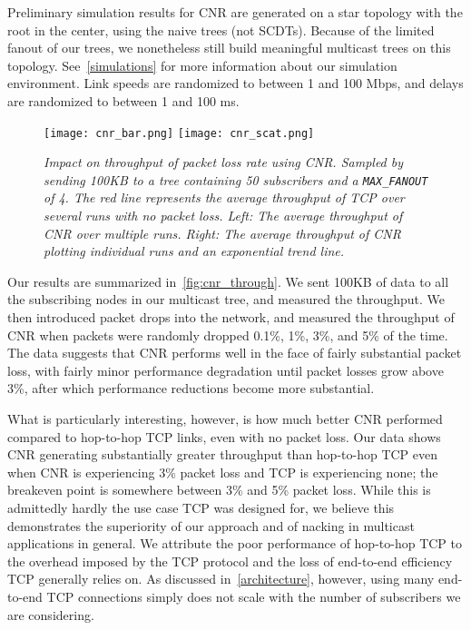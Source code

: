 Preliminary simulation results for CNR are generated on a star topology with the root in the center, using the naive trees (not SCDTs). Because of the limited fanout  of our trees, we nonetheless still build meaningful multicast trees on this topology.  See~\autoref{simulations} for more information about our simulation environment.  Link speeds are randomized to between 1 and 100 Mbps, and delays are randomized to between 1 and 100 ms.

\begin{figure}[h]
	\begin{center}
		\texttt{[image: cnr\_bar.png]}
		\texttt{[image: cnr\_scat.png]}
	\end{center}
	\vspace{-1.3em}
	\caption{\small \itshape Impact on throughput of packet loss rate using CNR. Sampled by sending 100KB to a tree containing 50 subscribers and a \texttt{MAX\_FANOUT} of 4. The red line represents the average throughput of TCP over several runs with no packet loss.  Left: The average throughput of CNR over multiple runs. Right: The average throughput of CNR plotting individual runs and an exponential trend line.}
	\vspace{-1em}
	\label{fig:cnr_through}
\end{figure}

Our results are summarized in~\autoref{fig:cnr_through}. We sent 100KB of data to all the subscribing nodes in our multicast tree, and measured the throughput. We then introduced packet drops into the network, and measured the throughput of CNR when packets were randomly dropped 0.1\%, 1\%, 3\%, and 5\% of the time. The data suggests that CNR performs well in the face of fairly substantial packet loss, with fairly minor performance degradation until packet losses grow above 3\%, after which performance reductions become more substantial. 

What is particularly interesting, however, is how much better CNR performed compared to hop-to-hop TCP links, even with no packet loss. Our data shows CNR generating substantially greater throughput than hop-to-hop TCP even when CNR is experiencing 3\% packet loss and TCP is experiencing none; the breakeven point is somewhere between 3\% and 5\% packet loss. While this is admittedly hardly the use case TCP was designed for, we believe this demonstrates the superiority of our approach and of nacking in multicast applications in general. We attribute the poor performance of hop-to-hop TCP to the overhead imposed by the TCP protocol and the loss of end-to-end efficiency \cite{end-to-end-args} TCP generally relies on. As discussed in~\autoref{architecture}, however, using many end-to-end TCP connections simply does not scale with the number of subscribers we are considering.

